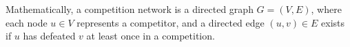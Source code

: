 \documentclass[preview]{standalone}
\begin{document}
Mathematically, a competition network is a directed graph $G = (V, E)$, where each node $u \in V$ represents a competitor, and a directed edge $(u, v) \in E$ exists if $u$ has defeated $v$ at least once in a competition.\\
\end{document}
